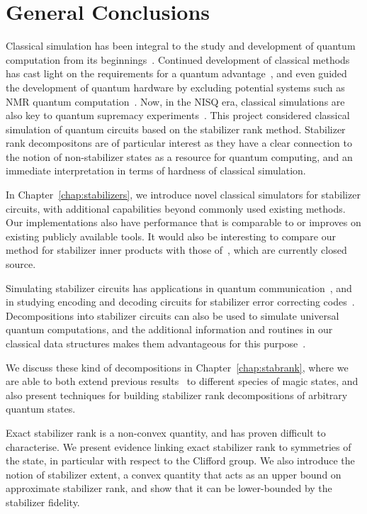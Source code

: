 
\chapter{General Conclusions}
\label{chap:conclusion}
Classical simulation has been integral to the study and development of quantum computation from its beginnings~\cite{Feynman1982}. Continued development of classical methods has cast light on the requirements for a quantum advantage~\cite{Jozsa2003}, and even guided the development of quantum hardware by excluding potential systems such as NMR quantum computation~\cite{Braunstein1999}. Now, in the NISQ era, classical simulations are also key to quantum supremacy experiments~\cite{Preskill2012,Aaronson2016}. This project considered classical simulation of quantum circuits based on the stabilizer rank method. Stabilizer rank decompositons are of particular interest as they have a clear connection to the notion of non-stabilizer states as a resource for quantum computing, and an immediate interpretation in terms of hardness of classical simulation.\par
In Chapter~\ref{chap:stabilizers}, we introduce novel classical simulators for stabilizer circuits, with additional capabilities beyond commonly used existing methods. Our implementations also have performance that is comparable to or improves on existing publicly available tools. It would also be interesting to compare our method for stabilizer inner products with those of~\cite{Garcia2012}, which are currently closed source.\par
Simulating stabilizer circuits has applications in quantum communication~\cite{Bennett1992,Bennett1993}, and in studying encoding and decoding circuits for stabilizer error correcting codes~\cite{Aaronson2004,Gottesman1997}. Decompositions into stabilizer circuits can also be used to simulate universal quantum computations, and the additional information and routines in our classical data structures makes them advantageous for this purpose~\cite{Bravyi2018}.\par
We discuss these kind of decompositions in Chapter~\ref{chap:stabrank}, where we are able to both extend previous results~\cite{Bravyi2015,Bravyi2016} to different species of magic states, and also present techniques for building stabilizer rank decompositions of arbitrary quantum states.\par
Exact stabilizer rank is a non-convex quantity, and has proven difficult to characterise. We present evidence linking exact stabilizer rank to symmetries of the state, in particular with respect to the Clifford group. We also introduce the notion of stabilizer extent, a convex quantity that acts as an upper bound on approximate stabilizer rank, and show that it can be lower-bounded by the stabilizer fidelity.\par
